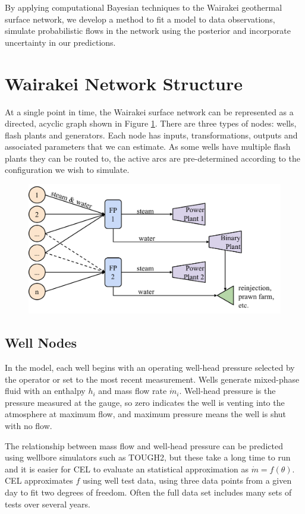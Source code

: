 \documentclass[a4paper, 12pt]{article}
\begin{document}
By applying computational Bayesian techniques to the Wairakei geothermal surface network, we develop a  method to fit a model to data observations, simulate probabilistic flows in the network using the posterior and incorporate uncertainty in our predictions.

\section{Wairakei Network Structure}

At a single point in time, the Wairakei surface network can be represented as a directed, acyclic graph shown in Figure \ref{fig:network_diagram}. There are three types of nodes: wells, flash plants and generators. Each node has inputs, transformations,  outputs and associated parameters that we can estimate. As some wells have multiple flash plants they can be routed to, the active arcs are pre-determined according to the configuration we wish to simulate.

\begin{figure}
  \centering
  \includegraphics[width=0.5\linewidth]{media/network_diagram}
  \label{fig:network_diagram}
\end{figure}

\subsection{Well Nodes}
In the model, each well begins with an operating well-head pressure selected by the operator or set to the most recent measurement. Wells generate mixed-phase fluid with an enthalpy $h_i$ and mass flow rate $\dot{m}_i$. Well-head pressure is the pressure measured at the gauge, so zero indicates the well is venting into the atmosphere at maximum flow, and maximum pressure means the well is shut with no flow.

The relationship between mass flow and well-head pressure can be predicted using wellbore simulators such as TOUGH2, but these take a long time to run and it is easier for CEL to evaluate an statistical approximation as $\dot{m} = f(\theta)$. CEL approximates $f$ using well test data, using three data points from a given day to fit two degrees of freedom. Often the full data set includes many sets of tests over several years.
\end{document}

